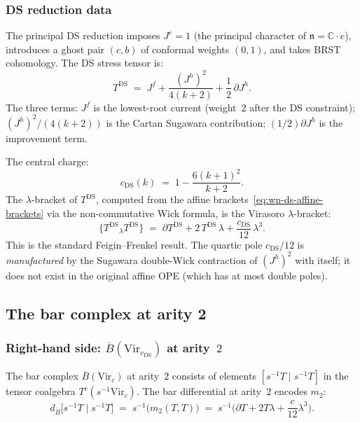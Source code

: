 \documentclass[11pt]{article}
\newcommand{\fn}{\mathfrak{n}}
\newcommand{\barB}{\overline{B}}
\newcommand{\C}{\mathbb{C}}
\begin{document}
\subsubsection*{DS reduction data}

The principal DS reduction imposes $J^e = 1$
(the principal character of $\fn = \C\!\cdot\!e$),
introduces a ghost pair $(c, b)$ of conformal weights
$(0, 1)$, and takes BRST cohomology.  The DS stress
tensor is:
\begin{equation}\label{eq:wn-ds-stress-tensor}
T^{\mathrm{DS}}
\;=\;
J^f + \frac{(J^h)^2}{4(k+2)} + \frac{1}{2}\,\partial J^h.
\end{equation}
The three terms: $J^f$ is the lowest-root current
(weight~$2$ after the DS constraint); $(J^h)^2/(4(k+2))$ is
the Cartan Sugawara contribution; $(1/2)\partial J^h$ is the
improvement term.

The central charge:
\begin{equation}\label{eq:wn-ds-cc}
c_{\mathrm{DS}}(k)
\;=\;
1 - \frac{6(k+1)^2}{k+2}.
\end{equation}
The $\lambda$-bracket of $T^{\mathrm{DS}}$, computed from
the affine brackets~\eqref{eq:wn-ds-affine-brackets} via the
non-commutative Wick formula, is the Virasoro
$\lambda$-bracket:
\begin{equation}\label{eq:wn-ds-vir-bracket}
\{T^{\mathrm{DS}}{}_\lambda T^{\mathrm{DS}}\}
\;=\;
\partial T^{\mathrm{DS}} + 2\,T^{\mathrm{DS}}\,\lambda
+ \frac{c_{\mathrm{DS}}}{12}\,\lambda^3.
\end{equation}
This is the standard Feigin--Frenkel result.  The quartic
pole $c_{\mathrm{DS}}/12$ is \emph{manufactured} by the
Sugawara double-Wick contraction of $(J^h)^2$ with itself;
it does not exist in the original affine OPE (which has at
most double poles).

\subsection{The bar complex at arity 2}

\subsubsection*{Right-hand side:
$\barB(\mathrm{Vir}_{c_{\mathrm{DS}}})$ at arity~$2$}

The bar complex $\barB(\mathrm{Vir}_c)$ at arity~$2$
consists of elements $[s^{-1}T \mid s^{-1}T]$ in the
tensor coalgebra $T^c(s^{-1}\mathrm{Vir}_c)$.  The bar
differential at arity~$2$ encodes $m_2$:
\begin{equation}\label{eq:wn-vir-bar-2}
d_{\barB}\bigl[s^{-1}T \mid s^{-1}T\bigr]
\;=\;
s^{-1}\bigl(m_2(T, T)\bigr)
\;=\;
s^{-1}\bigl(\partial T + 2T\lambda
+ \frac{c}{12}\lambda^3\bigr).
\end{equation}
\end{document}
